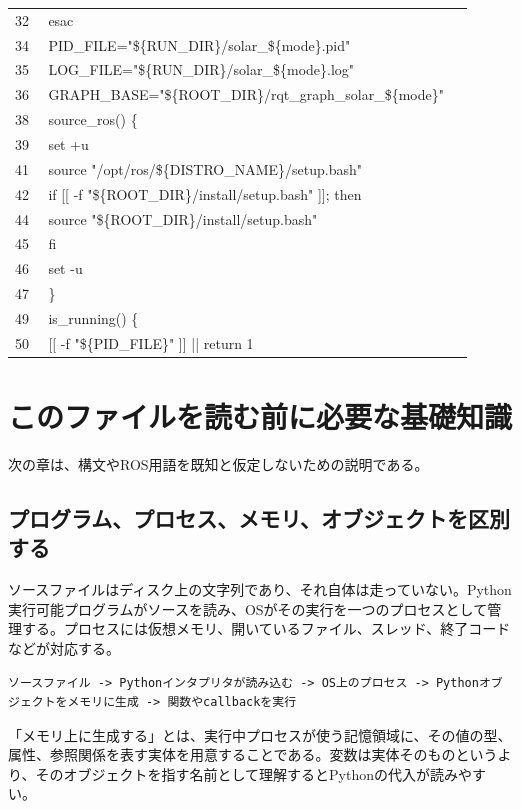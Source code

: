 \documentclass[a4paper,11pt]{article}
\begin{document}
\begin{longtable}{p{0.07\linewidth} p{0.84\linewidth}}
32 & esac \\
34 & PID\_FILE="\$\{RUN\_DIR\}/solar\_\$\{mode\}.pid" \\
35 & LOG\_FILE="\$\{RUN\_DIR\}/solar\_\$\{mode\}.log" \\
36 & GRAPH\_BASE="\$\{ROOT\_DIR\}/rqt\_graph\_solar\_\$\{mode\}" \\
38 & source\_ros() \{ \\
39 & set +u \\
41 & source "/opt/ros/\$\{DISTRO\_NAME\}/setup.bash" \\
42 & if [[ -f "\$\{ROOT\_DIR\}/install/setup.bash" ]]; then \\
44 & source "\$\{ROOT\_DIR\}/install/setup.bash" \\
45 & fi \\
46 & set -u \\
47 & \} \\
49 & is\_running() \{ \\
50 & [[ -f "\$\{PID\_FILE\}" ]] || return 1 \\
            \bottomrule
            \end{longtable}



        \section{このファイルを読む前に必要な基礎知識}
        次の章は、構文やROS用語を既知と仮定しないための説明である。

        \subsection{プログラム、プロセス、メモリ、オブジェクトを区別する}
ソースファイルはディスク上の文字列であり、それ自体は走っていない。Python実行可能プログラムがソースを読み、OSがその実行を一つのプロセスとして管理する。プロセスには仮想メモリ、開いているファイル、スレッド、終了コードなどが対応する。


\begin{lstlisting}
ソースファイル -> Pythonインタプリタが読み込む -> OS上のプロセス -> Pythonオブジェクトをメモリに生成 -> 関数やcallbackを実行
\end{lstlisting}


「メモリ上に生成する」とは、実行中プロセスが使う記憶領域に、その値の型、属性、参照関係を表す実体を用意することである。変数は実体そのものというより、そのオブジェクトを指す名前として理解するとPythonの代入が読みやすい。
\end{document}
